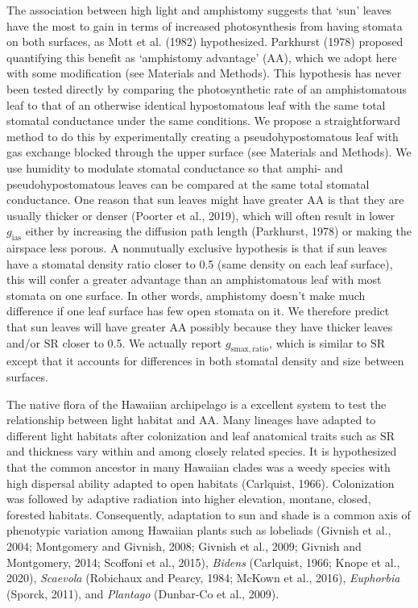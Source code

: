 \documentclass[
  letterpaper,
  DIV=11,
  numbers=noendperiod]{scrartcl}
\begin{document}
The association between high light and amphistomy suggests that `sun'
leaves have the most to gain in terms of increased photosynthesis from
having stomata on both surfaces, as Mott et al. (1982) hypothesized.
Parkhurst (1978) proposed quantifying this benefit as `amphistomy
advantage' (\(\mathrm{AA}\)), which we adopt here with some modification
(see Materials and Methods). This hypothesis has never been tested
directly by comparing the photosynthetic rate of an amphistomatous leaf
to that of an otherwise identical hypostomatous leaf with the same total
stomatal conductance under the same conditions. We propose a
straightforward method to do this by experimentally creating a
pseudohypostomatous leaf with gas exchange blocked through the upper
surface (see Materials and Methods). We use humidity to modulate
stomatal conductance so that amphi- and pseudohypostomatous leaves can
be compared at the same total stomatal conductance. One reason that sun
leaves might have greater \(\mathrm{AA}\) is that they are usually
thicker or denser (Poorter et al., 2019), which will often result in
lower \(g_\mathrm{ias}\) either by increasing the diffusion path length
(Parkhurst, 1978) or making the airspace less porous. A nonmutually
exclusive hypothesis is that if sun leaves have a stomatal density ratio
closer to 0.5 (same density on each leaf surface), this will confer a
greater advantage than an amphistomatous leaf with most stomata on one
surface. In other words, amphistomy doesn't make much difference if one
leaf surface has few open stomata on it. We therefore predict that sun
leaves will have greater \(\mathrm{AA}\) possibly because they have
thicker leaves and/or \(\mathrm{SR}\) closer to 0.5. We actually report
\(g_{\mathrm{smax,ratio}}\), which is similar to \(\mathrm{SR}\) except
that it accounts for differences in both stomatal density and size
between surfaces.

The native flora of the Hawaiian archipelago is a excellent system to
test the relationship between light habitat and \(\mathrm{AA}\). Many
lineages have adapted to different light habitats after colonization and
leaf anatomical traits such as \(\mathrm{SR}\) and thickness vary within
and among closely related species. It is hypothesized that the common
ancestor in many Hawaiian clades was a weedy species with high dispersal
ability adapted to open habitats (Carlquist, 1966). Colonization was
followed by adaptive radiation into higher elevation, montane, closed,
forested habitats. Consequently, adaptation to sun and shade is a common
axis of phenotypic variation among Hawaiian plants such as lobeliads
(Givnish et al., 2004; Montgomery and Givnish, 2008; Givnish et al.,
2009; Givnish and Montgomery, 2014; Scoffoni et al., 2015),
\emph{Bidens} (Carlquist, 1966; Knope et al., 2020), \emph{Scaevola}
(Robichaux and Pearcy, 1984; McKown et al., 2016), \emph{Euphorbia}
(Sporck, 2011), and \emph{Plantago} (Dunbar-Co et al., 2009).
\end{document}
